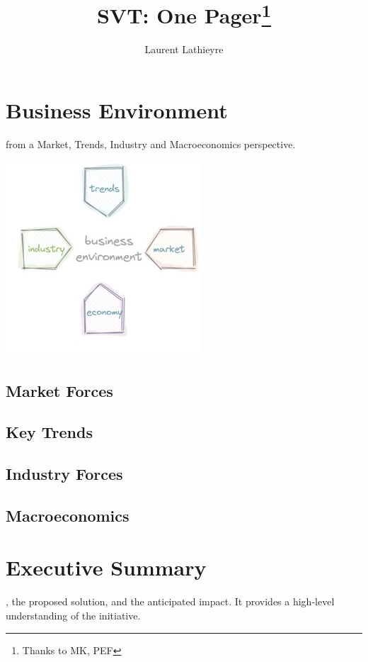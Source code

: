 \documentclass{tufte-handout}
\title{SVT: One Pager\thanks{Thanks to MK, PEF}}
\author{Laurent Lathieyre}
\begin{document}
\maketitle %

\begin{abstract}
  \noindent
  
\end{abstract}

\section{Business Environment}\label{sec:business-environment}
   from a Market, Trends, Industry and Macroeconomics perspective.
  \begin{marginfigure}
    \includegraphics{biz-env}
  \end{marginfigure}
  \subsection{Market Forces}\label{sec:market-forces}
  \subsection{Key Trends}\label{key-trends}
  \subsection{Industry Forces}\label{industry-forces}
  \subsection{Macroeconomics}\label{macroeconomics}



\section{Executive Summary}\label{exec-summary}
  , the proposed solution, and the anticipated impact. It provides a high-level understanding of the initiative.
  
\end{document}
